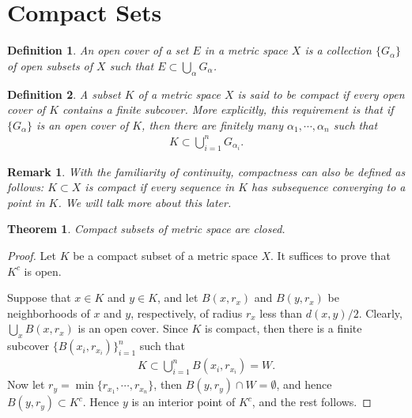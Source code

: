\documentclass[11pt]{book}
\newtheorem{definition}{Definition}[chapter]
\newtheorem{theorem}{Theorem}[chapter]
\newtheorem{remark}{Remark}[chapter]
\theoremstyle{definition}
\numberwithin{equation}{chapter}
\begin{document}
\medskip


\section{Compact Sets}

\begin{definition}
An open cover of a set $E$ in a metric space $X$ is a collection $\{G_{\alpha}\}$ of open subsets of $X$ such that $E \subset \bigcup_{\alpha} G_{\alpha}$.
\end{definition}

\medskip

\begin{definition}
A subset $K$ of a metric space $X$ is said to be compact if every open cover of $K$ contains a finite subcover. More explicitly, this requirement is that if $\{G_{\alpha}\}$ is an open cover of $K$, then there are finitely many $\alpha_1, \cdots, \alpha_n$ such that 
\begin{align*}
    K \subset \bigcup^n_{i=1} G_{\alpha_i}.
\end{align*}
\end{definition}

\begin{remark}
With the familiarity of continuity, compactness can also be defined as follows: $K \subset X$ is compact if every sequence in $K$ has subsequence converging to a point in $K$. We will talk more about this later.
\end{remark}

\medskip

\begin{theorem}\label{th_115}
Compact subsets of metric space are closed.
\end{theorem}
\begin{proof}
Let $K$ be a compact subset of a metric space $X$. It suffices to prove that $K^c$ is open.

Suppose that $x \in K$ and $y \in K$, and let $B(x,r_x)$ and $B(y,r_x)$ be neighborhoods of $x$ and $y$, respectively, of radius $r_x$ less than $d(x,y)/2$. Clearly, $\bigcup_x B(x,r_x)$ is an open cover. Since $K$ is compact, then there is a finite subcover $\{B\left(x_i, r_{x_i}\right)\}^n_{i=1}$ such that 
\begin{align*}
    K \subset \bigcup^n_{i=1} B\left(x_i, r_{x_i}\right) = W.
\end{align*}
Now let $r_y = \min \{r_{x_1}, \cdots, r_{x_n}\}$, then $B(y,r_y) \cap W = \emptyset$, and hence $B(y,r_y) \subset K^c$. Hence $y$ is an interior point of $K^c$, and the rest follows.
\end{proof}
\end{document}
